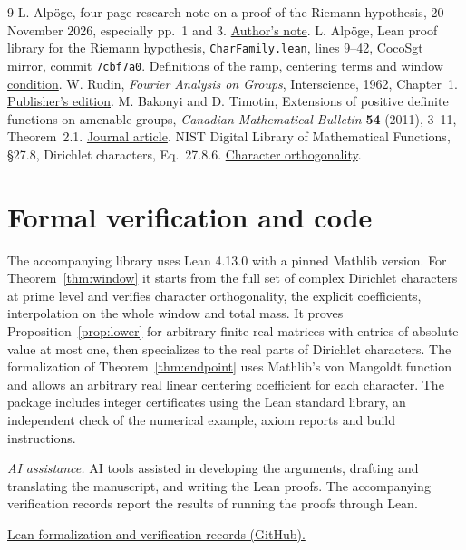 \documentclass[11pt,a4paper]{article}
\newcommand{\codeURL}{https://github.com/ZhaoJiuxiao-expert/signed-weights-positive-extension/tree/main/lean}
\begin{document}
\begin{thebibliography}{9}
 L. Alp\"oge, four-page research note on a proof of the Riemann hypothesis, 20 November 2026, especially pp.~1 and 3. \href{https://alpo.ge/remark.pdf}{Author's note}.
 L. Alp\"oge, Lean proof library for the Riemann hypothesis, \texttt{CharFamily.lean}, lines 9--42, CocoSgt mirror, commit \texttt{7cbf7a0}. \href{https://github.com/CocoSgt/riemann-hypothesis-lean/blob/7cbf7a0c32fca1badf05931879a37c3f8a2b03b4/src/Development/AutomorphicArithmetic/DedekindLFunctions/CharFamily.lean\#L9-L42}{Definitions of the ramp, centering terms and window condition}.
 W. Rudin, \emph{Fourier Analysis on Groups}, Interscience, 1962, Chapter~1. \href{https://doi.org/10.1002/9781118165621}{Publisher's edition}.
 M. Bakonyi and D. Timotin, Extensions of positive definite functions on amenable groups, \emph{Canadian Mathematical Bulletin} \textbf{54} (2011), 3--11, Theorem~2.1. \href{https://doi.org/10.4153/CMB-2010-081-0}{Journal article}.
 NIST Digital Library of Mathematical Functions, \S27.8, Dirichlet characters, Eq.~27.8.6. \href{https://dlmf.nist.gov/27.8.E6}{Character orthogonality}.
\end{thebibliography}

\section*{Formal verification and code}
The accompanying library uses Lean 4.13.0 with a pinned Mathlib version. For Theorem~\ref{thm:window} it starts from the full set of complex Dirichlet characters at prime level and verifies character orthogonality, the explicit coefficients, interpolation on the whole window and total mass. It proves Proposition~\ref{prop:lower} for arbitrary finite real matrices with entries of absolute value at most one, then specializes to the real parts of Dirichlet characters. The formalization of Theorem~\ref{thm:endpoint} uses Mathlib's von Mangoldt function and allows an arbitrary real linear centering coefficient for each character. The package includes integer certificates using the Lean standard library, an independent check of the numerical example, axiom reports and build instructions.

\smallskip\noindent\textit{AI assistance.} AI tools assisted in developing the arguments, drafting and translating the manuscript, and writing the Lean proofs. The accompanying verification records report the results of running the proofs through Lean.

\smallskip\noindent\href{\codeURL}{Lean formalization and verification records (GitHub).}
\ifdefined\IncludeChinese
  \clearpage
  
\fi
\end{document}
